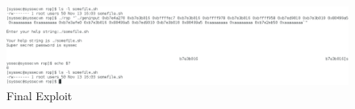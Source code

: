 \documentclass[a4paper,11pt]{article}
\begin{document}
\begin{figure}[H] \center
  \includegraphics[width=1.1\linewidth]{pics/rop.png}
  \caption{Final Exploit}
  \label{fig:exploit}
\end{figure}
\end{document}
